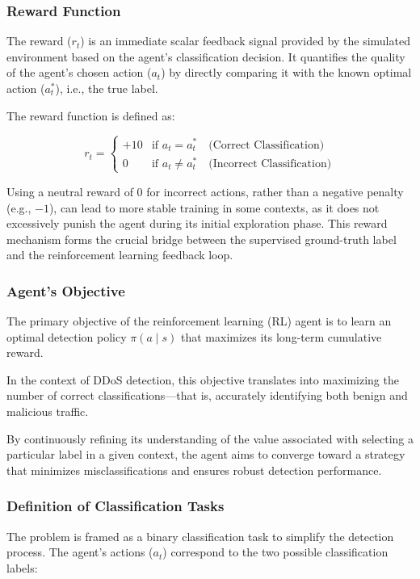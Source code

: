 \documentclass{report}
\begin{document}
\subsubsection{Reward Function}

The reward ($r_t$) is an immediate scalar feedback signal provided by the simulated environment based on the agent's classification decision. It quantifies the quality of the agent’s chosen action ($a_t$) by directly comparing it with the known optimal action ($a_t^*$), i.e., the true label.

The reward function is defined as:

\[
r_t =
\begin{cases}
+10 & \text{if } a_t = a_t^* \quad \text{(Correct Classification)} \\
0   & \text{if } a_t \ne a_t^* \quad \text{(Incorrect Classification)}
\end{cases}
\]

Using a neutral reward of 0 for incorrect actions, rather than a negative penalty (e.g., $-1$), can lead to more stable training in some contexts, as it does not excessively punish the agent during its initial exploration phase. This reward mechanism forms the crucial bridge between the supervised ground-truth label and the reinforcement learning feedback loop.

\subsubsection{Agent's Objective}

The primary objective of the reinforcement learning (RL) agent is to learn an optimal detection policy $\pi(a \mid s)$ that maximizes its long-term cumulative reward. 

In the context of DDoS detection, this objective translates into maximizing the number of correct classifications—that is, accurately identifying both benign and malicious traffic. 

By continuously refining its understanding of the value associated with selecting a particular label in a given context, the agent aims to converge toward a strategy that minimizes misclassifications and ensures robust detection performance.

\subsubsection{Definition of Classification Tasks}

The problem is framed as a binary classification task to simplify the detection process. The agent's actions ($a_t$) correspond to the two possible classification labels:
\end{document}
